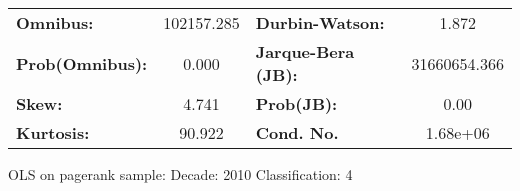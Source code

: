 \begin{center}
\begin{tabular}{lccccc}
\end{tabular}
\begin{tabular}{lclc}
\textbf{Omnibus:}       & 102157.285 & \textbf{  Durbin-Watson:     } &      1.872    \\
\textbf{Prob(Omnibus):} &    0.000   & \textbf{  Jarque-Bera (JB):  } & 31660654.366  \\
\textbf{Skew:}          &    4.741   & \textbf{  Prob(JB):          } &       0.00    \\
\textbf{Kurtosis:}      &   90.922   & \textbf{  Cond. No.          } &   1.68e+06    \\
\bottomrule
\end{tabular}
\end{center}
\break
OLS on pagerank sample: Decade: 2010 Classification: 4

